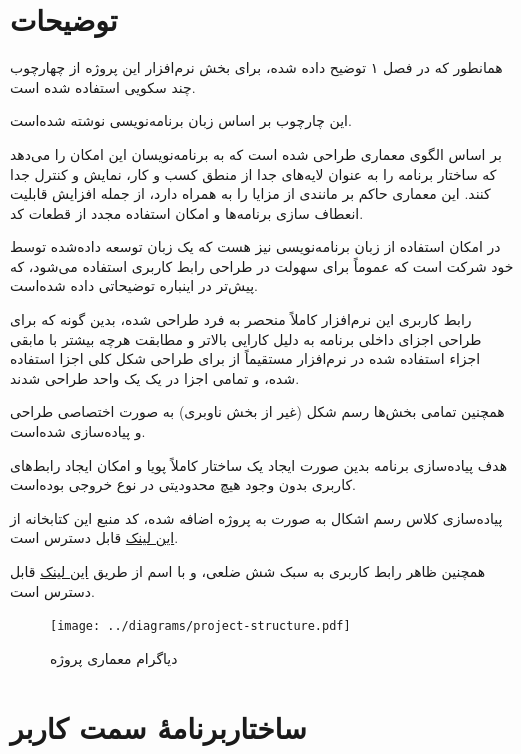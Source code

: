\label{chap4}
\section{توضیحات}\label{sec1:chap4}

همانطور که در فصل ۱ توضیح داده شده، برای بخش نرم‌افزار این پروژه از چهارچوب چند سکویی  استفاده شده است.

این چارچوب بر اساس زبان برنامه‌نویسی  نوشته شده‌است.

 بر اساس الگوی معماری  طراحی شده است که به برنامه‌نویسان این امکان را می‌دهد که ساختار برنامه را به عنوان لایه‌های جدا از منطق کسب و کار، نمایش و کنترل جدا کنند. این معماری حاکم بر  مانندی از مزایا را به همراه دارد، از جمله افزایش قابلیت انعطاف سازی برنامه‌ها و امکان استفاده مجدد از قطعات کد.

در  امکان استفاده از زبان ‌برنامه‌نویسی  نیز هست که یک زبان توسعه داده‌شده توسط خود شرکت  است که عموماً برای سهولت در طراحی رابط کاربری استفاده می‌شود، که پیش‌تر در اینباره توضیحاتی داده شده‌است.

رابط کاربری این نرم‌افزار کاملاً منحصر به فرد طراحی شده، بدین گونه که برای طراحی اجزای داخلی برنامه به دلیل کارایی بالاتر و مطابقت هرچه بیشتر با مابقی اجزاء استفاده شده در نرم‌افزار مستقیماً از  برای طراحی شکل کلی اجزا استفاده شده، و تمامی اجزا در یک یک  واحد طراحی شدند.

همچنین تمامی بخش‌ها رسم شکل (غیر از بخش ناوبری) به صورت اختصاصی طراحی و پیاده‌سازی شده‌است.

هدف پیاده‌سازی برنامه بدین صورت ایجاد یک ساختار کاملاً پویا و امکان ایجاد رابط‌های کاربری بدون وجود هیچ محدودیتی در نوع خروجی بوده‌است.

پیاده‌سازی کلاس رسم اشکال به صورت
به پروژه اضافه شده،‌ کد منبع این کتابخانه از
\hyperref{https://github.com/0smr/veqtor}{}{}{این لینک}
 قابل دسترس است.

همچنین ظاهر رابط کاربری به سبک شش ضلعی، و با اسم
 از طریق
\hyperref{https://github.com/0smr/hive}{}{}{این لینک}
قابل دسترس است.

\begin{figure}[!h]
	\begin{center}
		\texttt{[image: ../diagrams/project-structure.pdf]}
	\end{center}
	\caption{دیاگرام معماری پروژه}
	\label{fig1:sec1:chap4}
\end{figure}

\section{ساختاربر‌نامهٔ سمت کاربر}\label{sec2:chap4}

